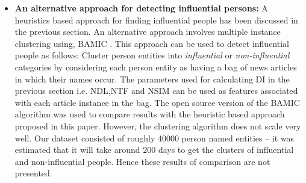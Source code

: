\begin{itemize}
\item \textbf {An alternative approach for detecting influential persons: }
A heuristics based approach for finding influential people has been discussed in the previous section. An alternative approach involves multiple instance clustering 
 using, BAMIC \cite{zhang2009multi}. 
 This approach can be used to detect influential people as follows: Cluster person entities into \emph{influential} or \emph{non-influential} categories by considering each person entity as having a bag of news articles in which their names occur. 
The parameters used for calculating DI in the previous section i.e. NDL,NTF and NSIM can be used as features associated with each article instance in the bag.
The open source version of the BAMIC algorithm was used to compare results with the heuristic based approach proposed in this paper. However, the clustering algorithm does not scale very well. Our dataset consisted of roughly 40000 person named entities -- it was estimated that it will take around 200 days to get the clusters of influential and non-influential people.  Hence these results of comparison are not presented. 
\end{itemize}
